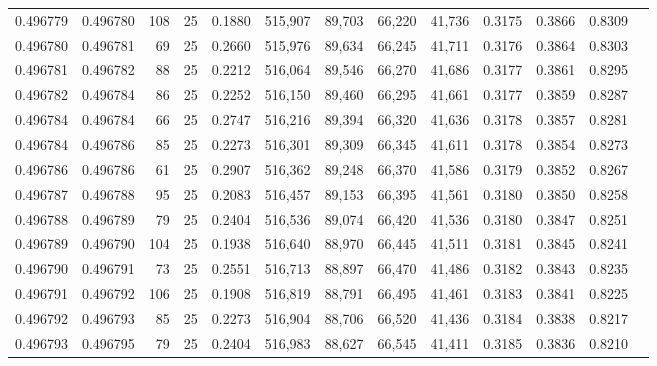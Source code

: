 \begin{tabular}{rrrrrrrrrrrrr}
0.496779 & 0.496780 &   108 &  25 &                                     0.1880 & 515,907 &  89,703 &  66,220 &  41,736 & 0.3175 & 0.3866 & 0.8309 \\
0.496780 & 0.496781 &    69 &  25 &                                     0.2660 & 515,976 &  89,634 &  66,245 &  41,711 & 0.3176 & 0.3864 & 0.8303 \\
0.496781 & 0.496782 &    88 &  25 &                                     0.2212 & 516,064 &  89,546 &  66,270 &  41,686 & 0.3177 & 0.3861 & 0.8295 \\
0.496782 & 0.496784 &    86 &  25 &                                     0.2252 & 516,150 &  89,460 &  66,295 &  41,661 & 0.3177 & 0.3859 & 0.8287 \\
0.496784 & 0.496784 &    66 &  25 &                                     0.2747 & 516,216 &  89,394 &  66,320 &  41,636 & 0.3178 & 0.3857 & 0.8281 \\
0.496784 & 0.496786 &    85 &  25 &                                     0.2273 & 516,301 &  89,309 &  66,345 &  41,611 & 0.3178 & 0.3854 & 0.8273 \\
0.496786 & 0.496786 &    61 &  25 &                                     0.2907 & 516,362 &  89,248 &  66,370 &  41,586 & 0.3179 & 0.3852 & 0.8267 \\
0.496787 & 0.496788 &    95 &  25 &                                     0.2083 & 516,457 &  89,153 &  66,395 &  41,561 & 0.3180 & 0.3850 & 0.8258 \\
0.496788 & 0.496789 &    79 &  25 &                                     0.2404 & 516,536 &  89,074 &  66,420 &  41,536 & 0.3180 & 0.3847 & 0.8251 \\
0.496789 & 0.496790 &   104 &  25 &                                     0.1938 & 516,640 &  88,970 &  66,445 &  41,511 & 0.3181 & 0.3845 & 0.8241 \\
0.496790 & 0.496791 &    73 &  25 &                                     0.2551 & 516,713 &  88,897 &  66,470 &  41,486 & 0.3182 & 0.3843 & 0.8235 \\
0.496791 & 0.496792 &   106 &  25 &                                     0.1908 & 516,819 &  88,791 &  66,495 &  41,461 & 0.3183 & 0.3841 & 0.8225 \\
0.496792 & 0.496793 &    85 &  25 &                                     0.2273 & 516,904 &  88,706 &  66,520 &  41,436 & 0.3184 & 0.3838 & 0.8217 \\
0.496793 & 0.496795 &    79 &  25 &                                     0.2404 & 516,983 &  88,627 &  66,545 &  41,411 & 0.3185 & 0.3836 & 0.8210 \\

\end{tabular}

